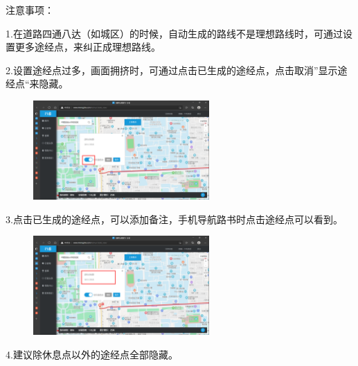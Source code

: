 \documentclass{ctexbook}
\begin{document}
注意事项：

1.在道路四通八达（如城区）的时候，自动生成的路线不是理想路线时，可通过设置更多途经点，来纠正成理想路线。

2.设置途经点过多，画面拥挤时，可通过点击已生成的途经点，点击取消''显示途经点``来隐藏。
       \begin{figure}[H]
            \begin{center}
            \includegraphics[width=0.6\textwidth]{fig/行者9}
            \end{center}
        \end{figure}

3.点击已生成的途经点，可以添加备注，手机导航路书时点击途经点可以看到。
       \begin{figure}[H]
            \begin{center}
            \includegraphics[width=0.6\textwidth]{fig/行者10}
            \end{center}
        \end{figure}

4.建议除休息点以外的途经点全部隐藏。
\end{document}
